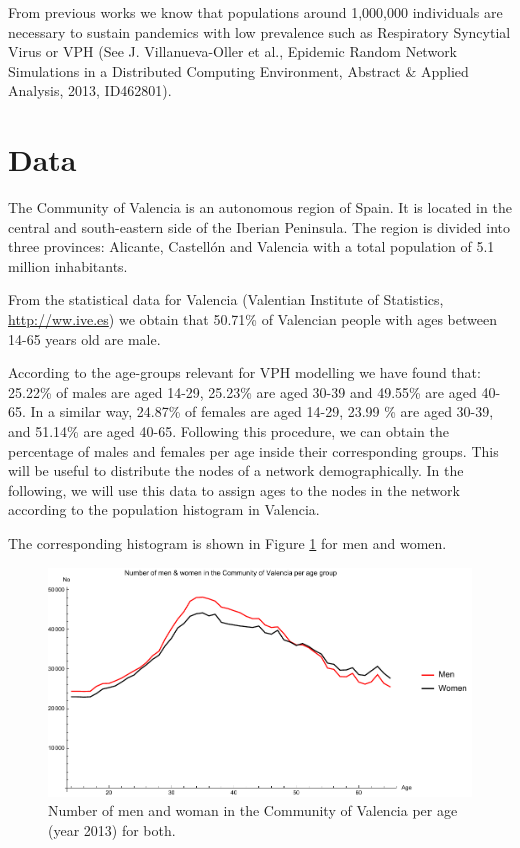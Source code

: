 From previous works we know that populations around 1,000,000 individuals are necessary to sustain pandemics with low prevalence such as Respiratory Syncytial Virus or VPH (See J. Villanueva-Oller et al., Epidemic Random Network Simulations in a Distributed Computing Environment, Abstract \& Applied Analysis, 2013, ID462801). 

\section{Data}
The Community of Valencia is an autonomous region of Spain. It is located in the central and south-eastern side of the Iberian Peninsula. The region is divided into three provinces: Alicante, Castell\'on and Valencia with a total population of 5.1 million inhabitants.

From the statistical data for Valencia (Valentian Institute of Statistics, \url{http://ww.ive.es}) we obtain that 50.71\% of Valencian people with ages between 14-65 years old are male. 

According to the age-groups relevant for VPH modelling we have found that: 25.22\% of males are aged 14-29, 25.23\% are aged 30-39 and 49.55\% are aged 40-65. In a similar way, 24.87\% of females are aged 14-29, 23.99 \% are aged 30-39, and 51.14\% are aged 40-65. Following this procedure, we can obtain the percentage of males and females per age inside their corresponding groups. This will be useful to distribute the nodes of a network demographically. In the following, we will use this data to assign ages to the nodes in the network according to the population histogram in Valencia.

The corresponding histogram is shown in Figure \ref{demog} for men and women.

\begin{figure}[ht]
	\centering
	\includegraphics[scale=0.7]{demog.pdf}
	\caption{Number of men and woman in the Community of Valencia per age (year 2013) for both.}
	\label{demog}
\end{figure}

